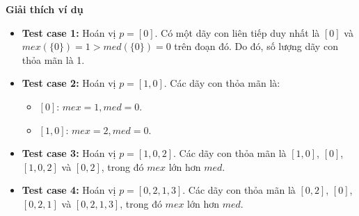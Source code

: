 \documentclass[12pt,a4paper]{article}
\newcommand{\explanation}{%
  \vspace{6pt}\textbf{\textcolor{sectioncolor}{Giải thích ví dụ}}\par\vspace{2pt}%
}
\begin{document}
\explanation
\begin{itemize}
    \item \textbf{Test case 1:} Hoán vị $p = [0]$. Có một dãy con liên tiếp duy nhất là $[0]$ và $mex(\{0\}) = 1 > med(\{0\}) = 0$ trên đoạn đó. Do đó, số lượng dãy con thỏa mãn là 1.
    \item \textbf{Test case 2:} Hoán vị $p = [1, 0]$. Các dãy con thỏa mãn là:
        \begin{itemize}
            \item $[0]$: $mex = 1, med = 0$.
            \item $[1, 0]$: $mex = 2, med = 0$.
        \end{itemize}
    \item \textbf{Test case 3:} Hoán vị $p = [1, 0, 2]$. Các dãy con thỏa mãn là $[1, 0]$, $[0]$, $[1, 0, 2]$ và $[0, 2]$, trong đó $mex$ lớn hơn $med$.
    \item \textbf{Test case 4:} Hoán vị $p = [0, 2, 1, 3]$. Các dãy con thỏa mãn là $[0, 2]$, $[0]$, $[0, 2, 1]$ và $[0, 2, 1, 3]$, trong đó $mex$ lớn hơn $med$.
\end{itemize}
\end{document}
